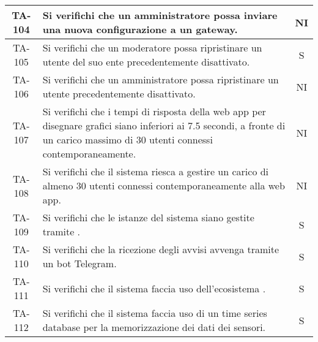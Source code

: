 \begin{center}
\begin{longtable}{|c|p{10cm}|c|}
			 \hline
			 TA-104 & Si verifichi che un amministratore possa inviare una nuova configurazione a un gateway. & NI \\
			 \hline
			 TA-105 & Si verifichi che un moderatore possa ripristinare un utente del suo ente precedentemente disattivato. & S \\
			 \hline
			 TA-106 & Si verifichi che un amministratore possa ripristinare un utente precedentemente disattivato. & NI \\
			 \hline
			 TA-107 & Si verifichi che i tempi di risposta della web app per disegnare grafici siano inferiori ai 7.5 secondi, a fronte di un carico massimo di 30 utenti connessi contemporaneamente. & NI \\
			 \hline
			 TA-108 & Si verifichi che il sistema riesca a gestire un carico di almeno 30 utenti connessi contemporaneamente alla web app. & NI \\
			 \hline
			 TA-109 & Si verifichi che le istanze del sistema siano gestite tramite \glock{Docker}. & S \\
			 \hline
			 TA-110 & Si verifichi che la ricezione degli avvisi avvenga tramite un bot Telegram. & S \\
			 \hline
			 TA-111 & Si verifichi che il sistema faccia uso dell'ecosistema \glock{Kafka}. & S \\
			 \hline
			 TA-112 & Si verifichi che il sistema faccia uso di un time series database per la memorizzazione dei dati dei sensori. & S \\

\end{longtable}
\end{center}
